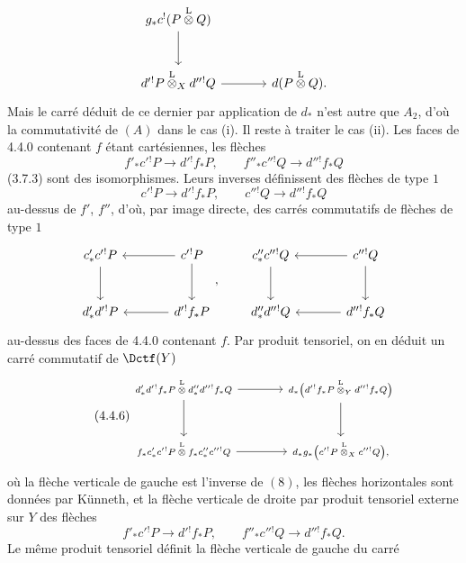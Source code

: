 \begin{prooftext}[Démonstration -]
\[\begin{tikzcd}[column sep=large,row sep=large]
g_*c^!(P\overset{\mathrm{L}}{\otimes}Q)\arrow[d]\\
d'{}^!P\overset{\mathrm{L}}{\otimes}_Xd''{}^!Q \arrow[r] &
d(P\overset{\mathrm{L}}{\otimes}Q).
\end{tikzcd}
\]
Mais le carré déduit de ce dernier par application de $d_*$ n'est autre que $A_2$, d'où la commutativité de $(A)$ dans le cas (i). Il reste à traiter le cas (ii). Les faces de 4.4.0 contenant $f$ étant cartésiennes, les flèches
\[
f'_*c'{}^!P\longrightarrow d'{}^!f_*P,\qquad
f''_*c''{}^!Q\longrightarrow d''{}^!f_*Q
\]
(3.7.3) sont des isomorphismes. Leurs inverses définissent des flèches de type $1$
\[
c'{}^!P\longrightarrow d'{}^!f_*P,\qquad
c''{}^!Q\longrightarrow d''{}^!f_*Q
\]
au-dessus de $f'$, $f''$, d'où, par image directe, des carrés commutatifs de flèches de type $1$
\[
\begin{tikzcd}[column sep=large,row sep=large]
c'_*c'{}^!P \arrow[d] & c'{}^!P\arrow[l]\arrow[d]\\
d'_*d'{}^!P & d'{}^!f_*P\arrow[l]
\end{tikzcd}
,\qquad
\begin{tikzcd}[column sep=large,row sep=large]
c''_*c''{}^!Q \arrow[d] & c''{}^!Q\arrow[l]\arrow[d]\\
d''_*d''{}^!Q & d''{}^!f_*Q\arrow[l]
\end{tikzcd}
\]
au-dessus des faces de 4.4.0 contenant $f$. Par produit tensoriel, on en déduit un carré commutatif de $\Dctf(Y)$
\begin{equation}
\tag{4.4.6}
\begin{tikzcd}[column sep=large,row sep=large,cells={nodes={font=\scriptsize}},every label/.append style={font=\scriptsize}]
d'_*d'{}^!f_*P\overset{\mathrm{L}}{\otimes}d''_*d''{}^!f_*Q
 \arrow[r]\arrow[d] &
d_*\bigl(d'{}^!f_*P\overset{\mathrm{L}}{\otimes}_Yd''{}^!f_*Q\bigr)\arrow[d]\\
f_*c'_*c'{}^!P\overset{\mathrm{L}}{\otimes}f_*c''_*c''{}^!Q
 \arrow[r] &
d_*g_*\bigl(c'{}^!P\overset{\mathrm{L}}{\otimes}_Xc''{}^!Q\bigr),
\end{tikzcd}
\end{equation}
où la flèche verticale de gauche est l'inverse de $(8)$, les flèches horizontales sont données par Künneth, et la flèche verticale de droite par produit tensoriel externe sur $Y$ des flèches
\[
f'_*c'{}^!P\longrightarrow d'{}^!f_*P,\qquad
f''_*c''{}^!Q\longrightarrow d''{}^!f_*Q.
\]
Le même produit tensoriel définit la flèche verticale de gauche du carré
\begin{equation}

\end{equation}
\end{prooftext}
